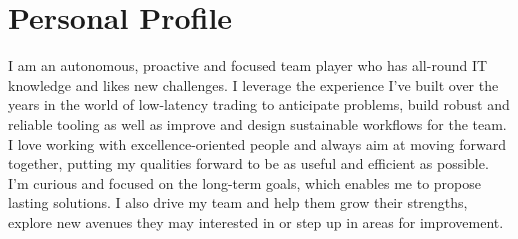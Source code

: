\documentclass[11pt,a4paper,sans]{moderncv}        %
\begin{document}
\section{Personal Profile}
I am an autonomous, proactive and focused team player who has all-round IT knowledge and likes new challenges. I leverage the experience I've built over the years in the world of low-latency trading to anticipate problems, build robust and reliable tooling as well as improve and design sustainable workflows for the team.\newline
I love working with excellence-oriented people and always aim at moving forward together, putting my qualities forward to be as useful and efficient as possible. I'm curious and focused on the long-term goals, which enables me to propose lasting solutions. I also drive my team and help them grow their strengths, explore new avenues they may interested in or step up in areas for improvement.
\end{document}
